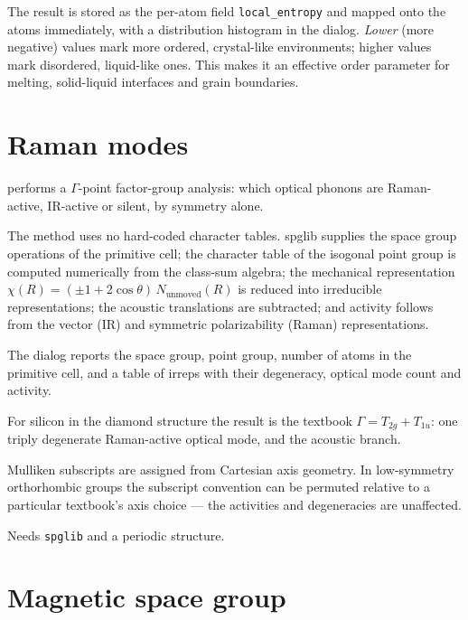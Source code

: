 The result is stored as the per-atom field \texttt{local\_entropy} and
mapped onto the atoms immediately, with a distribution histogram in the
dialog. \emph{Lower} (more negative) values mark more ordered,
crystal-like environments; higher values mark disordered, liquid-like ones.
This makes it an effective order parameter for melting, solid-liquid
interfaces and grain boundaries.

\section{Raman modes}
\label{sec:raman-modes-ref}

\menusep{} performs a $\Gamma$-point
factor-group analysis: which optical phonons are Raman-active, IR-active or
silent, by symmetry alone.

The method uses no hard-coded character tables. spglib supplies the space
group operations of the primitive cell; the character table of the isogonal
point group is computed numerically from the class-sum algebra; the
mechanical representation $\chi(R) = (\pm 1 + 2\cos\theta)\,N_\text{unmoved}(R)$
is reduced into irreducible representations; the acoustic translations are
subtracted; and activity follows from the vector (IR) and symmetric
polarizability (Raman) representations.

The dialog reports the space group, point group, number of atoms in the
primitive cell, and a table of irreps with their degeneracy, optical mode
count and activity.

\begin{caltip}
For silicon in the diamond structure the result is the textbook
$\Gamma = T_{2g} + T_{1u}$: one triply degenerate Raman-active optical
mode, and the acoustic branch.
\end{caltip}

\begin{calnote}
Mulliken subscripts are assigned from Cartesian axis geometry. In
low-symmetry orthorhombic groups the subscript convention can be permuted
relative to a particular textbook's axis choice --- the activities and
degeneracies are unaffected.
\end{calnote}

\begin{calwarn}
Needs \texttt{spglib} and a periodic structure.
\end{calwarn}

\section{Magnetic space group}
\label{sec:magnetic-space-group}

